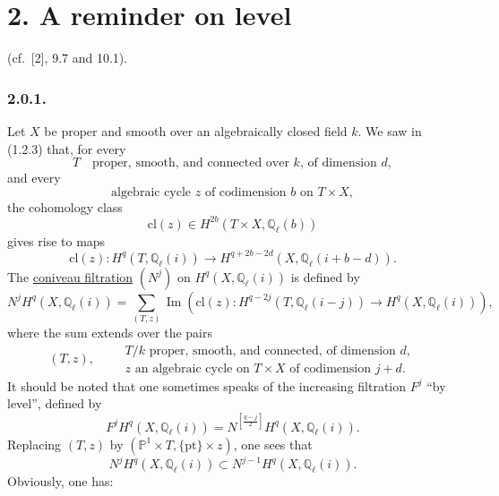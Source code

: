 \section*{2. A reminder on level}
\noindent(cf.~[2], 9.7 and 10.1).

\subsubsection*{2.0.1.}
Let $X$ be proper and smooth over an algebraically closed field $k$.  We saw
in (1.2.3) that, for every
\begin{equation}\tag{2.0.2}
T\quad\text{proper, smooth, and connected over $k$, of dimension $d$},
\end{equation}
and every
\begin{equation}\tag{2.0.3}
\text{algebraic cycle $z$ of codimension $b$ on $T\times X$},
\end{equation}
the cohomology class
\begin{equation}\tag{2.0.4}
\mathrm{cl}(z)\in H^{2b}(T\times X,\mathbb Q_\ell(b))
\end{equation}
gives rise to maps
\begin{equation}\tag{2.0.5}
\mathrm{cl}(z):H^q(T,\mathbb Q_\ell(i))\longrightarrow
H^{q+2b-2d}(X,\mathbb Q_\ell(i+b-d)).
\end{equation}
The \underline{coniveau filtration} $(N^j)$ on
$H^q(X,\mathbb Q_\ell(i))$ is defined by
\begin{equation}\tag{2.0.6}
N^jH^q(X,\mathbb Q_\ell(i))
=\sum_{(T,z)}\operatorname{Im}\!\left(
\mathrm{cl}(z):H^{q-2j}(T,\mathbb Q_\ell(i-j))
\longrightarrow H^q(X,\mathbb Q_\ell(i))\right),
\end{equation}
where the sum extends over the pairs
\begin{equation}\tag{2.0.7}
(T,z),\qquad
\begin{array}{l}
T/k\text{ proper, smooth, and connected, of dimension }d,\\
z\text{ an algebraic cycle on }T\times X\text{ of codimension }j+d.
\end{array}
\end{equation}
It should be noted that one sometimes speaks of the increasing filtration
$F^j$ ``by level'', defined by
\begin{equation}\tag{2.0.8}
F^jH^q(X,\mathbb Q_\ell(i))
=N^{\left[\frac{q-j}{2}\right]}H^q(X,\mathbb Q_\ell(i)).
\end{equation}
Replacing $(T,z)$ by $(\mathbb P^1\times T,\{\mathrm{pt}\}\times z)$, one
sees that
\begin{equation}\tag{2.0.9}
N^jH^q(X,\mathbb Q_\ell(i))
\subset N^{j-1}H^q(X,\mathbb Q_\ell(i)).
\end{equation}
Obviously, one has:

